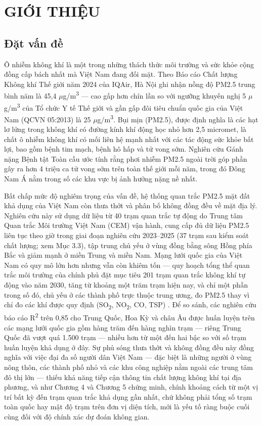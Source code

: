 \chapter{GIỚI THIỆU}
\label{chuong1}


\section{Đặt vấn đề}

Ô nhiễm không khí là một trong những thách thức môi trường và sức khỏe cộng đồng cấp bách nhất mà Việt Nam đang đối mặt. Theo Báo cáo Chất lượng Không khí Thế giới năm 2024 của IQAir, Hà Nội ghi nhận nồng độ PM2.5 trung bình năm là 45,4 $\mu$g/m\textsuperscript{3} --- cao gấp hơn chín lần so với ngưỡng khuyến nghị 5 $\mu$g/m\textsuperscript{3} của Tổ chức Y tế Thế giới và gần gấp đôi tiêu chuẩn quốc gia của Việt Nam (QCVN 05:2013) là 25 $\mu$g/m\textsuperscript{3}. Bụi mịn (PM2.5), được định nghĩa là các hạt lơ lửng trong không khí có đường kính khí động học nhỏ hơn 2,5 micromet, là chất ô nhiễm không khí có mối liên hệ mạnh nhất với các tác động sức khỏe bất lợi, bao gồm bệnh tim mạch, bệnh hô hấp và tử vong sớm. Nghiên cứu Gánh nặng Bệnh tật Toàn cầu ước tính rằng phơi nhiễm PM2.5 ngoài trời góp phần gây ra hơn 4 triệu ca tử vong sớm trên toàn thế giới mỗi năm, trong đó Đông Nam Á nằm trong số các khu vực bị ảnh hưởng nặng nề nhất.

Bất chấp mức độ nghiêm trọng của vấn đề, hệ thống quan trắc PM2.5 mặt đất khả dụng của Việt Nam còn thưa thớt và phân bố không đồng đều về mặt địa lý. Nghiên cứu này sử dụng dữ liệu từ 40 trạm quan trắc tự động do Trung tâm Quan trắc Môi trường Việt Nam (CEM) vận hành, cung cấp đủ dữ liệu PM2.5 liên tục theo giờ trong giai đoạn nghiên cứu 2023--2025 (37 trạm sau kiểm soát chất lượng; xem Mục 3.3), tập trung chủ yếu ở vùng đồng bằng sông Hồng phía Bắc và giảm mạnh ở miền Trung và miền Nam. Mạng lưới quốc gia của Việt Nam có quy mô lớn hơn nhưng vẫn còn khiêm tốn --- quy hoạch tổng thể quan trắc môi trường của chính phủ đặt mục tiêu 201 trạm quan trắc không khí tự động vào năm 2030, tăng từ khoảng một trăm trạm hiện nay, và chỉ một phần trong số đó, chủ yếu ở các thành phố trực thuộc trung ương, đo PM2.5 thay vì chỉ đo các khí được quy định (SO\textsubscript{2}, NO\textsubscript{2}, CO, TSP) \cite{vietnamplus2024}. Để so sánh, các nghiên cứu báo cáo R\textsuperscript{2} trên 0,85 cho Trung Quốc, Hoa Kỳ và châu Âu được huấn luyện trên các mạng lưới quốc gia gồm hàng trăm đến hàng nghìn trạm --- riêng Trung Quốc đã vượt quá 1.500 trạm --- nhiều hơn từ một đến hai bậc so với số trạm huấn luyện khả dụng ở đây. Sự phủ sóng thưa thớt và không đồng đều này đồng nghĩa với việc đại đa số người dân Việt Nam --- đặc biệt là những người ở vùng nông thôn, các thành phố nhỏ và các khu công nghiệp nằm ngoài các trung tâm đô thị lớn --- thiếu khả năng tiếp cận thông tin chất lượng không khí tại địa phương, và như Chương 4 và Chương 5 chứng minh, chính khoảng cách từ một vị trí bất kỳ đến trạm quan trắc khả dụng gần nhất, chứ không phải tổng số trạm toàn quốc hay mật độ trạm trên đơn vị diện tích, mới là yếu tố ràng buộc cuối cùng đối với độ chính xác dự đoán không gian.

